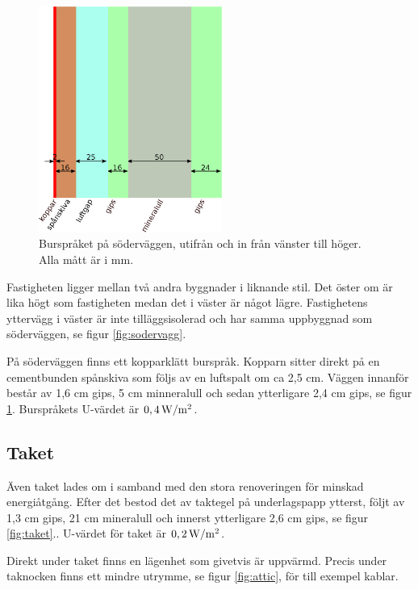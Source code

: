 \begin{figure}[hpbt]
\centering
\includegraphics[width=6cm]{images/bursprak.eps}
\caption{\label{fig:bursprak}{Burspråket på söderväggen, utifrån och in från vänster till höger. Alla mått är i mm.}}
\end{figure}

Fastigheten ligger mellan två andra byggnader i liknande stil. Det öster om är lika högt som fastigheten medan det i väster är något lägre. Fastighetens yttervägg i väster är inte tilläggsisolerad och har samma uppbyggnad som söderväggen, se figur \ref{fig:sodervagg}.

På söderväggen finns ett kopparklätt burspråk. Kopparn sitter direkt på en cementbunden spånskiva som följs av en luftspalt om ca 2,5 cm. Väggen innanför består av 1,6 cm gips, 5 cm minneralull och sedan ytterligare 2,4 cm gips, se figur \ref{fig:bursprak}.\cite{kandidatarbete2010} Burspråkets U-värdet är $\unit[0,4]{W/m^2}$.

\subsection{Taket}
Även taket lades om i samband med den stora renoveringen för minskad energiåtgång. Efter det bestod det av taktegel på underlagspapp ytterst, följt av 1,3 cm gips, 21 cm mineralull och innerst ytterligare 2,6 cm gips, se figur \ref{fig:taket}.\cite{kandidatarbete2010}. U-värdet för taket är $\unit[0,2]{W/m^2}$.

Direkt under taket finns en lägenhet som givetvis är uppvärmd. Precis under taknocken finns ett mindre utrymme, se figur \ref{fig:attic}, för till exempel kablar.

